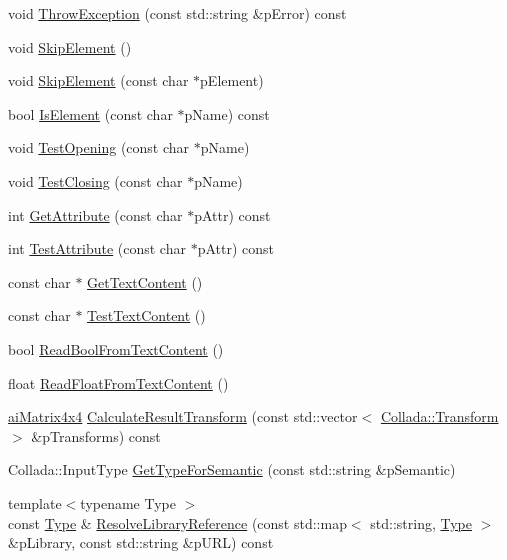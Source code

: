 \begin{DoxyCompactItemize}
\item 
void \hyperlink{class_assimp_1_1_collada_parser_a5bee81038d013b75b112a76bf5f7b587}{Throw\+Exception} (const std\+::string \&p\+Error) const 
\item 
void \hyperlink{class_assimp_1_1_collada_parser_a51ce3f8faeaf419017562a4250787e4d}{Skip\+Element} ()
\item 
void \hyperlink{class_assimp_1_1_collada_parser_a8c220c9b3e052d3bdc39a7bf0810adb5}{Skip\+Element} (const char $\ast$p\+Element)
\item 
bool \hyperlink{class_assimp_1_1_collada_parser_ab88eb3deb2c29556cb306bc64ade7f2a}{Is\+Element} (const char $\ast$p\+Name) const 
\item 
void \hyperlink{class_assimp_1_1_collada_parser_ae4c2905dddcf1439987d19f447bf8064}{Test\+Opening} (const char $\ast$p\+Name)
\item 
void \hyperlink{class_assimp_1_1_collada_parser_a33ca34a65b5ce2a0cf3d12e546d599b2}{Test\+Closing} (const char $\ast$p\+Name)
\item 
int \hyperlink{class_assimp_1_1_collada_parser_a422a6b14b7f78c3cedf5e30fb2f55609}{Get\+Attribute} (const char $\ast$p\+Attr) const 
\item 
int \hyperlink{class_assimp_1_1_collada_parser_a489d5ed878b55e984146ba78915c0da8}{Test\+Attribute} (const char $\ast$p\+Attr) const 
\item 
const char $\ast$ \hyperlink{class_assimp_1_1_collada_parser_a7d95361d1faa2db22bbb60956e97d78e}{Get\+Text\+Content} ()
\item 
const char $\ast$ \hyperlink{class_assimp_1_1_collada_parser_ae17c01f640367946ea94b7288ea3bfe6}{Test\+Text\+Content} ()
\item 
bool \hyperlink{class_assimp_1_1_collada_parser_aede8359c88f3aa1890ae9966b0362097}{Read\+Bool\+From\+Text\+Content} ()
\item 
float \hyperlink{class_assimp_1_1_collada_parser_a60698958b7bed62c3692fa2a6d3648e4}{Read\+Float\+From\+Text\+Content} ()
\item 
\hyperlink{structai_matrix4x4}{ai\+Matrix4x4} \hyperlink{class_assimp_1_1_collada_parser_ace50fe275756ffb761c9214d31aa9bd3}{Calculate\+Result\+Transform} (const std\+::vector$<$ \hyperlink{struct_assimp_1_1_collada_1_1_transform}{Collada\+::\+Transform} $>$ \&p\+Transforms) const 
\item 
Collada\+::\+Input\+Type \hyperlink{class_assimp_1_1_collada_parser_a19e1f4a4b9f64cef91add1d6dcdc2234}{Get\+Type\+For\+Semantic} (const std\+::string \&p\+Semantic)
\item 
{\footnotesize template$<$typename Type $>$ }\\const \hyperlink{struct_type}{Type} \& \hyperlink{class_assimp_1_1_collada_parser_a05be378a0b7cc6608e5842793ac66312}{Resolve\+Library\+Reference} (const std\+::map$<$ std\+::string, \hyperlink{struct_type}{Type} $>$ \&p\+Library, const std\+::string \&p\+U\+R\+L) const 
\end{DoxyCompactItemize}
